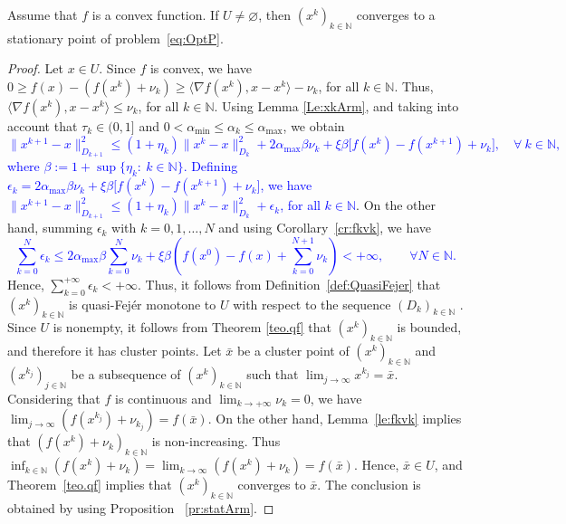 \begin{corollary} \label{cor:xkquasifeArm}
	Assume that $f$ is a convex function. If $U \neq \varnothing$, then $(x^k)_{k\in\mathbb{N}}$ converges to a stationary point of problem~\eqref{eq:OptP}.
\end{corollary}
\begin{proof}
	Let $x \in U$.  Since  $f$ is convex, we have $0\geq f(x)-(f(x^k)+\nu_k)\geq \langle \nabla f(x^k),x-x^k\rangle -\nu_k$, for all $k\in \mathbb{N}$. Thus, $\langle \nabla f(x^k),x-x^k\rangle\leq \nu_k$, for all $k\in \mathbb{N}$.   Using Lemma \ref{Le:xkArm},  and taking into account  that  $\tau_k \in (0, 1]$  and  $0<\alpha_{\min}\leq \alpha_k \leq \alpha_{\max}$,  we obtain
\textcolor{blue}{
	$$
		\|x^{k+1}-x\|_{D_{k+1}}^2 \leq (1+\eta_k)\|x^k-x\|_{D_k}^2+2 \alpha_{\max}\beta \nu_k+ \xi \beta \big[f(x^k) - f(x^{k+1}) +\nu_k\big], \quad \forall~k \in \mathbb{N}, 
	$$
where $\beta:=1+\sup\{\eta_k:~k\in\mathbb{N}\} $.
	Defining $\epsilon_k =  2 \alpha_{\max} \beta \nu_k + \xi \beta\big[f(x^k) - f(x^{k+1}) +\nu_k\big]$, we have $\|x^{k+1}-x\|_{D_{k+1}}^2 \leq (1+\eta_k)\|x^k-x\|_{D_k}^2+ \epsilon_k$, for all $k \in \mathbb{N}$}. On the other hand, summing $\epsilon_k$ with $k = 0, 1, \ldots, N$ and using  Corollary~\ref{cr:fkvk},  we have
\textcolor{blue}{
$$
\sum_{k=0}^N \epsilon_k \leq 2   \alpha_{\max} \beta \sum_{k=0}^N \nu_k +  \xi \beta\left(f(x^0) - f(x) + \sum_{k=0}^{N+1} \nu_k \right) < +\infty, \qquad \forall N \in \mathbb{N}.
$$
}	
Hence, $\sum_{k=0}^{+\infty} \epsilon_k<+\infty$.  Thus, it follows from  Definition~\ref{def:QuasiFejer}  that $(x^k)_{k\in\mathbb{N}}$ is quasi-Fej\'er monotone to $U$ with respect to the sequence  $(D_k)_{k\in\mathbb{N}}$ . Since  $U$ is nonempty, it follows from Theorem \ref{teo.qf} that $(x^k)_{k\in\mathbb{N}}$ is bounded, and therefore it has cluster points. Let $\bar{x}$ be a cluster point of $(x^k)_{k\in\mathbb{N}}$ and $(x^{k_j})_{j\in\mathbb{N}}$ be a subsequence of $(x^k)_{k\in\mathbb{N}}$ such that $\lim_{j \to \infty} x^{k_j} = \bar{x}$. Considering that $f$ is continuous and $\lim_{k\to +\infty} \nu_{k} = 0$, we have $\lim_{j \to \infty} (f(x^{k_j})+\nu_{k_j})= f(\bar{x})$.  On the other hand, Lemma~\ref{le:fkvk} implies that  $\left(f(x^k)+\nu_k\right)_{k\in\mathbb{N}}$ is  non-increasing. Thus  $\inf_{k\in {\mathbb N}}(f(x^{k})+\nu_k)= \lim_{k \to \infty} (f(x^{k})+\nu_{k}) = f(\bar{x}).$ Hence, $\bar{x} \in U$, and  Theorem~\ref{teo.qf}  implies that $(x^k)_{k\in\mathbb{N}}$ converges to $\bar{x}$.  The conclusion is obtained  by  using   Proposition ~\ref{pr:statArm}.
\end{proof}

